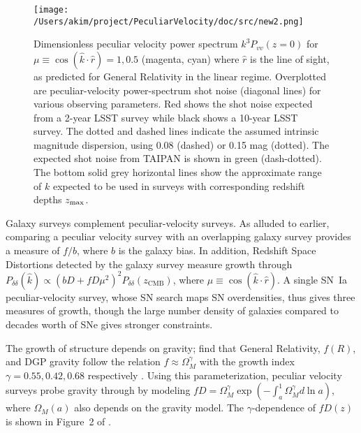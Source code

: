\begin{figure}
\centering
\texttt{[image: /Users/akim/project/PeculiarVelocity/doc/src/new2.png]}
\caption{Dimensionless peculiar velocity power spectrum $k^3P_{vv}(z=0)$ for $\mu \equiv \cos{(\hat{k} \cdot \hat{r})}=1, 0.5$ (magenta, cyan) 
where $\hat{r}$ is the line of sight, as predicted for General Relativity in the linear regime.
Overplotted are peculiar-velocity power-spectrum shot noise  (diagonal lines) for various observing parameters.  Red shows the shot noise expected from a 2-year LSST survey
while black shows a 10-year LSST survey.  The dotted and dashed lines indicate the assumed intrinsic magnitude dispersion, using 0.08 (dashed) or 0.15 mag (dotted).  The expected shot
noise from TAIPAN is shown in green (dash-dotted). 
%
The bottom solid grey horizontal lines show the approximate range of $k$ expected to be used in surveys with corresponding
redshift depths $z_{\rm max}$.
\label{power:fig}}
\end{figure}



Galaxy surveys complement peculiar-velocity surveys.  As alluded to earlier,
comparing a peculiar velocity survey with an overlapping galaxy survey provides a measure of $f/b$, where $b$ is the galaxy bias.
In addition, Redshift Space Distortions detected by the galaxy survey measure growth through  $P_{\delta \delta} (\hat{k})\propto (bD + fD\mu^2)^2P_{\delta \delta}(z_{\text{CMB}})$,
where $\mu\equiv \cos{(\hat{k} \cdot \hat{r})}$.
A single SN~Ia peculiar-velocity survey, whose SN search maps SN overdensities, thus gives three measures of growth, though the large number density
of galaxies compared to decades worth of SNe gives stronger constraints.

The  growth of structure depends on gravity;
\citet{PhysRevD.72.043529,2007APh....28..481L} find that General Relativity, $f(R)$,  and DGP gravity follow the relation
$f \approx \Omega_M^\gamma$ with the growth index $\gamma=0.55, 0.42, 0.68$ respectively \citep[see][for a review
or these  models]{HUTERER201523}.  
Using this parameterization, peculiar velocity
surveys probe  gravity through by modeling $fD=\Omega_M^{\gamma} \exp{\left(-\int_a^1 \Omega_M^{\gamma} d\ln{a} \right)}$,
where $\Omega_M(a)$ also depends on the gravity model.
The  $\gamma$-dependence of $fD(z)$ is shown 
in Figure~2 of  \citet{1475-7516-2013-04-031}.

